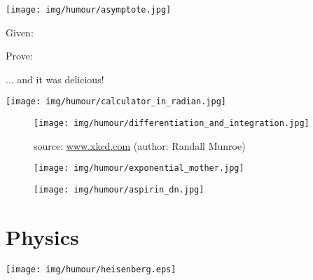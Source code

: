 	\begin{center}
		\texttt{[image: img/humour/asymptote.jpg]}	
	\end{center}
	
	\begin{center}\underline{\hspace{5 cm}}\end{center}
	Given:
	
	Prove:
	
	
	\begin{center}\underline{\hspace{5 cm}}\end{center}
	
	\begin{center}
	... and it was delicious!
	\end{center}
	
	\begin{center}
		\texttt{[image: img/humour/calculator\_in\_radian.jpg]}	
	\end{center}
	
	\begin{center}\underline{\hspace{5 cm}}\end{center}	
	
	\begin{figure}[H]
		\centering
		\texttt{[image: img/humour/differentiation\_and\_integration.jpg]}
		\caption[]{source: \url{www.xkcd.com} (author: Randall Munroe)}
	\end{figure}
	
	\begin{figure}[H]
		\centering
		\texttt{[image: img/humour/exponential\_mother.jpg]}
	\end{figure}
	
	\begin{center}\underline{\hspace{5 cm}}\end{center}	
	
	\begin{figure}[H]
		\centering
		\texttt{[image: img/humour/aspirin\_dn.jpg]}
	\end{figure}
	

	\pagebreak
	\section{Physics}
	
	\begin{center}
	\texttt{[image: img/humour/heisenberg.eps]}
	\end{center}
	

